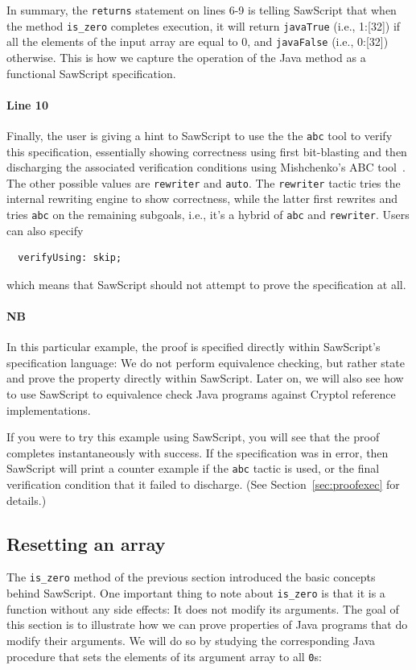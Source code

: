 \documentclass[12pt]{galois-whitepaper}
\newcommand{\sawScript}{{\sc SawScript}\xspace}
\begin{document}
In summary, the {\tt returns} statement on lines 6-9 is telling \sawScript that when the method {\tt is\_zero} completes execution, it will return
{\tt javaTrue} (i.e., 1:[32]) if all the elements of the input array are equal to 0, and {\tt javaFalse} (i.e., 0:[32]) otherwise. This is how we capture
the operation of the Java method as a functional \sawScript specification.

\paragraph{Line 10} Finally, the user is giving a hint to \sawScript to use the the {\tt abc} tool to verify this specification, essentially showing
correctness using first bit-blasting and then discharging the associated verification conditions
using Mishchenko's  ABC tool~\cite{ABC}. The other possible values are {\tt rewriter} and {\tt auto}.
The {\tt rewriter} tactic tries the internal rewriting engine to show correctness, while the latter first rewrites and tries {\tt abc} on the remaining subgoals, 
i.e., it's a hybrid of {\tt abc} and {\tt rewriter}. Users can also specify
\begin{Verbatim}
  verifyUsing: skip;
\end{Verbatim}
which means that \sawScript should not attempt to prove the specification at all.

\paragraph{NB} In this particular example, the proof is
specified directly within \sawScript's specification language: We do not perform equivalence checking, but rather
state and prove the property directly within \sawScript. Later on, we will also see how to use \sawScript to equivalence check Java programs
against Cryptol reference implementations.

If you were to try this example using \sawScript, you will see that the proof completes instantaneously with success. If the specification was in error, then
\sawScript will print a counter example if the {\tt abc} tactic is used, or the final verification condition that it failed to discharge.
(See Section~\ref{sec:proofexec} for details.)

\subsection{Resetting an array}
The {\tt is\_zero} method of the previous section introduced the basic concepts behind
\sawScript. One important thing to note about {\tt is\_zero} is that it is a function without
any side effects: It does not modify its arguments.
The goal of this
section is to illustrate how we can prove properties of Java programs that do modify their arguments.
We will do so by studying the corresponding Java procedure that sets the elements
of its argument array to all {\tt 0}s:
\end{document}
